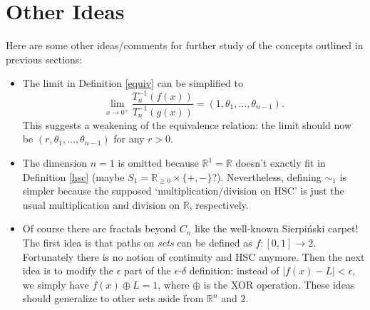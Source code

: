 \documentclass{article}
\theoremstyle{plain}
\begin{document}
\section{Other Ideas}
Here are some other ideas/comments for further study of the concepts outlined in previous sections:
\begin{itemize}
	\item The limit in Definition \ref{equiv} can be simplified to $$\lim_{x \rightarrow 0^+}\frac{T_n^{-1}(f(x))}{T_n^{-1}(g(x))} = (1, \theta_1, \ldots, \theta_{n-1}).$$ This suggests a weakening of the equivalence relation: the limit should now be $(r, \theta_1, \ldots, \theta_{n-1})$ for any $r > 0$.
	\item The dimension $n=1$ is omitted because $\mathbb{R}^1=\mathbb{R}$ doesn't exactly fit in Definition \ref{hsc} (maybe $S_1 = \mathbb{R}_{\ge 0} \times \{+, -\}$?). Nevertheless, defining $\sim_1$ is simpler because the supposed `multiplication/division on HSC' is just the usual multiplication and division on $\mathbb{R}$, respectively.
	\item Of course there are fractals beyond $C_n$ like the well-known Sierpiński carpet! The first idea is that paths on \textit{sets} can be defined as $f:[0,1] \rightarrow 2$. Fortunately there is no notion of continuity and HSC anymore. Then the next idea is to modify the $\epsilon$ part of the $\epsilon$-$\delta$ definition: instead of $|f(x)-L|<\epsilon$, we simply have $f(x) \oplus L = 1$, where $\oplus$ is the XOR operation. These ideas should generalize to other sets aside from $\mathbb{R}^n$ and $2$.
\end{itemize}



\end{document}
